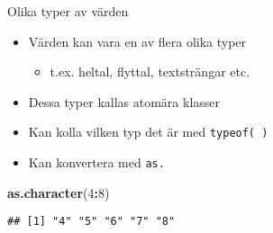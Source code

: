 \documentclass[
  10pt,
  ignorenonframetext,
]{beamer}
\newenvironment{Shaded}{\begin{snugshade}}{\end{snugshade}}
\newcommand{\DecValTok}[1]{\textcolor[rgb]{0.00,0.00,0.81}{#1}}
\newcommand{\FunctionTok}[1]{\textcolor[rgb]{0.13,0.29,0.53}{\textbf{#1}}}
\newcommand{\NormalTok}[1]{#1}
\newcommand{\SpecialCharTok}[1]{\textcolor[rgb]{0.81,0.36,0.00}{\textbf{#1}}}
\providecommand{\tightlist}{%
  \setlength{\itemsep}{0pt}\setlength{\parskip}{0pt}}
\begin{document}
\begin{frame}[fragile]{Olika typer av värden}
\protect\hypertarget{olika-typer-av-vuxe4rden}{}
\begin{itemize}
\tightlist
\item
  Värden kan vara en av flera olika typer

  \begin{itemize}
  \tightlist
  \item
    t.ex. heltal, flyttal, textsträngar etc.
  \end{itemize}
\item
  Dessa typer kallas atomära klasser
\item
  Kan kolla vilken typ det är med \texttt{typeof( )}
\item
  Kan konvertera med \texttt{as.}
\end{itemize}

\begin{Shaded}
\begin{Highlighting}[]
\FunctionTok{as.character}\NormalTok{(}\DecValTok{4}\SpecialCharTok{:}\DecValTok{8}\NormalTok{)}
\end{Highlighting}
\end{Shaded}

\begin{verbatim}
## [1] "4" "5" "6" "7" "8"
\end{verbatim}
\end{frame}
\end{document}
